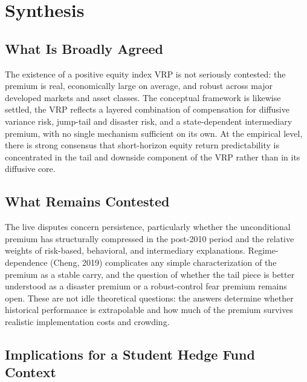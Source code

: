 \documentclass[11pt,a4paper]{article}
\begin{document}
\section{Synthesis}

\subsection{What Is Broadly Agreed}

The existence of a positive equity index VRP is not seriously contested: the premium is real, economically large on average, and robust across major developed markets and asset classes. The conceptual framework is likewise settled, the VRP reflects a layered combination of compensation for diffusive variance risk, jump-tail and disaster risk, and a state-dependent intermediary premium, with no single mechanism sufficient on its own. At the empirical level, there is strong consensus that short-horizon equity return predictability is concentrated in the tail and downside component of the VRP rather than in its diffusive core.

\subsection{What Remains Contested}

The live disputes concern persistence, particularly whether the unconditional premium has structurally compressed in the post-2010 period and the relative weights of risk-based, behavioral, and intermediary explanations. Regime-dependence (Cheng, 2019) complicates any simple characterization of the premium as a stable carry, and the question of whether the tail piece is better understood as a disaster premium or a robust-control fear premium remains open. These are not idle theoretical questions: the answers determine whether historical performance is extrapolable and how much of the premium survives realistic implementation costs and crowding.

\subsection{Implications for a Student Hedge Fund Context}
\end{document}
